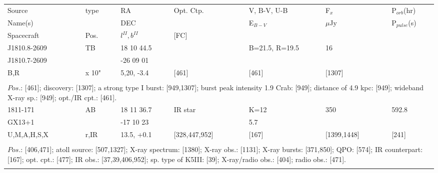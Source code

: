 \documentclass{aa}
\begin{document}
\begin{tabular}{p{2.5cm}p{1cm}p{1.8cm}p{2.3cm}p{3.3cm}p{2.0cm}p{2.2cm}}
\noalign{\smallskip}
\multicolumn{7}{p{17.5cm}}{Table 1.  (continued) }\\        
\hline
\noalign{\smallskip}
Source         & type  & RA                       &  Opt. Ctp. & V, B-V, U-B  & F$_{x}$          & P$_{orb}$(hr)    \\
Name(s)       &            & DEC                    &                     & E$_{B-V}$   & $\mu$Jy        & P$_{pulse}$(s) \\
Spacecraft & Pos.  & $l^{II}, b^{II}$      &  [FC]           &                        &                         &                             \\
\noalign{\smallskip} 
\hline

\noalign{\smallskip}
J1810.8-2609     & TB     & 18 10 44.5   &                 & B=21.5, R=19.5    & 16               &          \\
 J1810.7-2609    &            & -26 09 01     &                 &                                &                     &    \\
B,R                       & x 10"  & 5,20, -3.4      & [461]       & [461]                      & [1307]         &         \\
\\
\multicolumn{7}{p{17.5cm}}{
$Pos$.: [461]; discovery: [1307]; a strong type I burst: [949,1307]; burst peak intensity 1.9 Crab: [949]; 
distance of 4.9 kpc: [949]; wideband X-ray sp.: [949]; opt./IR cpt.: [461].}\\
\noalign{\smallskip}
\hline

\noalign{\smallskip}
1811-171         & AB         & 18 11 36.7         & IR star                  & K=12                      & 350                 & 592.8         \\
GX13+1           &                & -17 10 23           &                                & 5.7                          &                          &                    \\
U,M,A,H,S,X   & r,IR        & 13.5, +0.1          & [328,447,952]      & [167]                       & [1399,1448]   & [241]        \\
\\
\multicolumn{7}{p{17.5cm}}{
$Pos$.: [406,471]; atoll source: [507,1327]; X-ray spectrum: [1380]; X-ray obs.: [1131]; X-ray bursts: [371,850]; 
QPO: [574]; IR counterpart: [167]; opt. cpt.: [477]; IR obs.: [37,39,406,952]; sp. type of K5III: [39]; X-ray/radio 
obs.: [404]; radio obs.: [471].}\\
\noalign{\smallskip}
\hline


\end{tabular}
\end{document}
